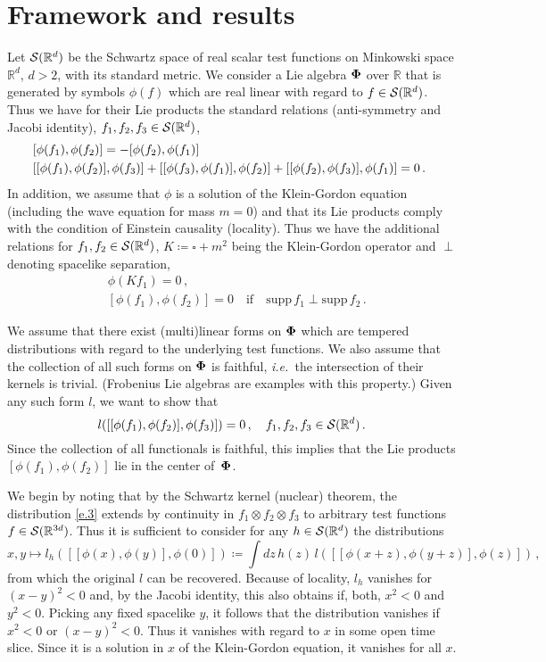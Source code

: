 \documentclass[11pt]{article}
\def\RR{\mathbb{R}}
\def\cS{{\cal S}}
\def\bPhi{\mbox{\boldmath $\Phi$}}
\def\ie{\textit{i.e.~}}
\def\be{\begin{equation}}
\def\ee{\end{equation}}
\begin{document}
\section{Framework and results}
\noindent  Let $\cS(\RR^d)$ 
be the Schwartz space of real scalar test functions on
Minkowski space $\RR^d$, $d > 2$, with its standard metric. We consider
a Lie algebra $\bPhi$ over $\RR$
that is generated by symbols $\phi(f)$ which are real linear with
regard to $f \in \cS(\RR^d)$. Thus we have for their Lie products the
standard relations (anti-symmetry and Jacobi identity),
$f_1,f_2,f_3 \in \cS(\RR^d)$, 
\begin{align}
& \hspace*{-1.5mm}  [\phi(f_1), \phi(f_2)] = -  [\phi(f_2), \phi(f_1)]  \\
& \hspace*{-1.5mm} [[\phi(f_1), \phi(f_2)],\phi(f_3)] + 
  [[\phi(f_3), \phi(f_1)],\phi(f_2)] +
  [[\phi(f_2), \phi(f_3)],\phi(f_1)] = 0 \, . \nonumber
\end{align}  
In addition, we assume that $\phi$ is a solution of the Klein-Gordon
equation (including the wave equation for mass $m=0$) and that
its Lie products comply with the condition of Einstein causality
(locality). Thus we have the additional relations
for $f_1, f_2 \in \cS(\RR^d)$, 
$K \coloneqq \square + m^2$ being the Klein-Gordon operator
and $\perp$ denoting spacelike separation,
\begin{align}
  & \phi(Kf_1) = 0 \, ,  \\
  &  [\phi(f_1), \phi(f_2)] = 0 \quad \text{if} \quad 
    \text{supp} \, f_1 \perp  \text{supp} \, f_2 \, . \nonumber 
\end{align}     

\medskip
We assume that there exist (multi)linear forms on $\bPhi$ which are
tempered distributions with regard to the underlying test functions.
We also assume that the collection of all such forms on $\bPhi$ is
faithful, \ie the intersection of their kernels is trivial.
(Frobenius Lie algebras are examples with this property.) Given any
such form $l$, we want to show that
\be \label{e.3}
l([[\phi(f_1), \phi(f_2)], \phi(f_3)]) = 0 \, ,
\quad f_1,f_2,f_3 \in \cS(\RR^d) \, .
\ee
Since the collection of all functionals is faithful, this implies that 
the Lie products $[\phi(f_1), \phi(f_2)]$ lie in the center of~$\bPhi$. 

\medskip
We begin by noting that by the Schwartz kernel (nuclear)
theorem, the distribution \eqref{e.3} extends by continuity
in $f_1 \otimes f_2 \otimes f_3$ to arbitrary test functions 
$f \in \cS(\RR^{3d})$. Thus it is sufficient to consider for any   
$h \in \cS(\RR^d)$ the distributions     
\be
x,y \mapsto l_h([[\phi(x),\phi(y)], \phi(0)])
\coloneqq \int \! dz \, h(z) \, l([[\phi(x +z),\phi(y + z)], \phi(z)]) \, ,
\ee
from which the original $l$ can be recovered. 
Because of locality, $l_h$ vanishes for $(x-y)^2 < 0$ and, by the Jacobi
identity, this also obtains if, both, $x^2 < 0$ and $y^2 < 0$.
Picking any fixed spacelike $y$, it follows that the  distribution
vanishes if $x^2 < 0$ or $(x - y)^2 < 0$. Thus it vanishes with regard 
to $x$ in some open 
time slice. Since it is a solution in $x$ of the Klein-Gordon equation,
it vanishes for all $x$. 
\end{document}
